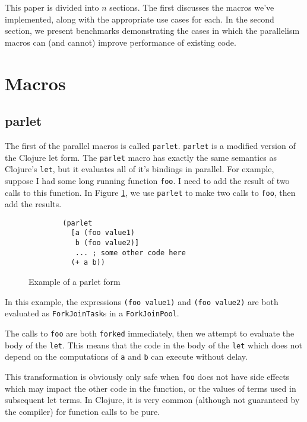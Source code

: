\documentclass{sig-alternate}
\def\mintcode#1{\mbox{\texttt{#1}}}
\def\code#1{\mbox{\texttt{#1}}}
\def\parlet{\code{parlet}}
\begin{document}

This paper is divided into $n$ sections. The first discusses the macros we've implemented, along with the appropriate use cases for each. In the second section, we present benchmarks demonstrating the cases in which the parallelism macros can (and cannot) improve performance of existing code.

\section{Macros}
\subsection{parlet}
The first of the parallel macros is called \parlet{}.
\parlet{} is a modified version of the Clojure let form.
The \parlet{} macro has exactly the same semantics as Clojure's \code{let}, but it evaluates all of it's bindings in parallel.
For example, suppose I had some long running function \code{foo}.
I need to add the result of two calls to this function.
In Figure \ref{fig:parlet_basic}, we use \parlet{} to make two calls to \code{foo}, then add the results.

\begin{figure}[h]
    \begin{verbatim}
        (parlet
          [a (foo value1)
           b (foo value2)]
           ... ; some other code here
          (+ a b))
    \end{verbatim}
    \caption{Example of a parlet form}
    \label{fig:parlet_basic}
\end{figure}

In this example, the expressions \mintcode{(foo value1)} and \mintcode{(foo value2)} are both evaluated as \code{ForkJoinTask}s in a \code{ForkJoinPool}.

The calls to \code{foo} are both \code{forked} immediately, then we attempt to evaluate the body of the \code{let}.
This means that the code in the body of the \code{let} which does not depend on the computations of \code{a} and \code{b} can execute without delay.

This transformation is obviously only safe when \code{foo} does not have side effects which may impact the other code in the function, or the values of terms used in subsequent let terms.
In Clojure, it is very common (although not guaranteed by the compiler) for function calls to be pure.
\end{document}

